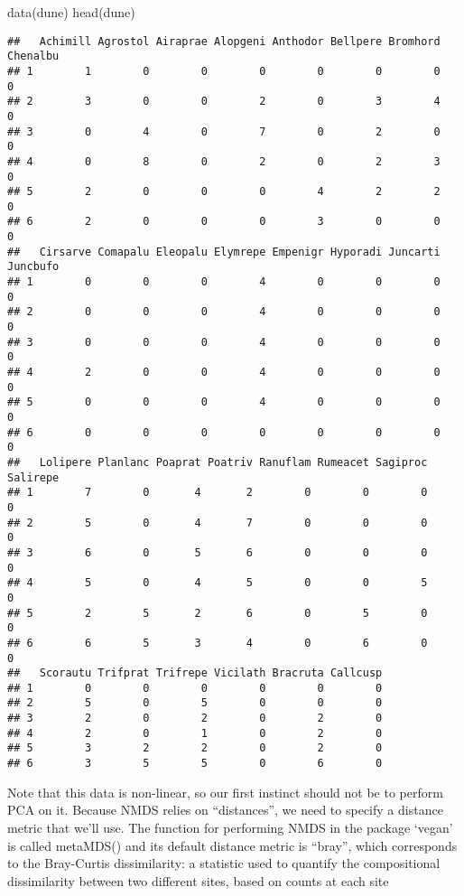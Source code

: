 \documentclass[
]{book}
\newenvironment{Shaded}{\begin{snugshade}}{\end{snugshade}}
\newcommand{\FunctionTok}[1]{\textcolor[rgb]{0.00,0.00,0.00}{#1}}
\newcommand{\NormalTok}[1]{#1}
\begin{document}
\begin{Shaded}
\begin{Highlighting}[]
\FunctionTok{data}\NormalTok{(dune)}
\FunctionTok{head}\NormalTok{(dune)}
\end{Highlighting}
\end{Shaded}

\begin{verbatim}
##   Achimill Agrostol Airaprae Alopgeni Anthodor Bellpere Bromhord Chenalbu
## 1        1        0        0        0        0        0        0        0
## 2        3        0        0        2        0        3        4        0
## 3        0        4        0        7        0        2        0        0
## 4        0        8        0        2        0        2        3        0
## 5        2        0        0        0        4        2        2        0
## 6        2        0        0        0        3        0        0        0
##   Cirsarve Comapalu Eleopalu Elymrepe Empenigr Hyporadi Juncarti Juncbufo
## 1        0        0        0        4        0        0        0        0
## 2        0        0        0        4        0        0        0        0
## 3        0        0        0        4        0        0        0        0
## 4        2        0        0        4        0        0        0        0
## 5        0        0        0        4        0        0        0        0
## 6        0        0        0        0        0        0        0        0
##   Lolipere Planlanc Poaprat Poatriv Ranuflam Rumeacet Sagiproc Salirepe
## 1        7        0       4       2        0        0        0        0
## 2        5        0       4       7        0        0        0        0
## 3        6        0       5       6        0        0        0        0
## 4        5        0       4       5        0        0        5        0
## 5        2        5       2       6        0        5        0        0
## 6        6        5       3       4        0        6        0        0
##   Scorautu Trifprat Trifrepe Vicilath Bracruta Callcusp
## 1        0        0        0        0        0        0
## 2        5        0        5        0        0        0
## 3        2        0        2        0        2        0
## 4        2        0        1        0        2        0
## 5        3        2        2        0        2        0
## 6        3        5        5        0        6        0
\end{verbatim}

Note that this data is non-linear, so our first instinct should not be to perform PCA on it. Because NMDS relies on ``distances'', we need to specify a distance metric that we'll use. The function for performing NMDS in the package `vegan' is called metaMDS() and its default distance metric is ``bray'', which corresponds to the Bray-Curtis dissimilarity: a statistic used to quantify the compositional dissimilarity between two different sites, based on counts at each site
\end{document}
